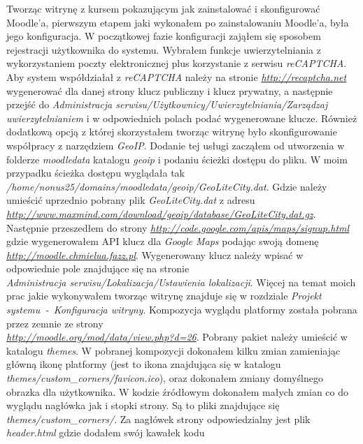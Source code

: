 Tworząc witrynę z kursem pokazującym jak zainstalować i skonfigurować Moodle'a, pierwszym etapem jaki wykonałem po zainstalowaniu Moodle'a, była jego konfiguracja. W początkowej fazie konfiguracji zająłem się sposobem rejestracji użytkownika do systemu. Wybrałem funkcje uwierzytelniania z wykorzystaniem poczty elektronicznej plus korzystanie z serwisu \textit{reCAPTCHA}. Aby system współdziałał z \textit{reCAPTCHA} należy na stronie \href{http://recaptcha.net}{\textit{http://recaptcha.net}} wygenerować dla danej strony klucz publiczny i klucz prywatny, a następnie przejść do \textit{Administracja serwisu/Użytkownicy/Uwierzytelniania/Zarządzaj uwierzytelnianiem} i w odpowiednich polach podać wygenerowane klucze. Również dodatkową opcją z której skorzystałem tworząc witrynę było skonfigurowanie współpracy z narzędziem \textit{GeoIP}. Dodanie tej usługi zacząłem od utworzenia w folderze \textit{moodledata} katalogu \textit{geoip} i podaniu ścieżki dostępu do pliku. W moim przypadku ścieżka dostępu wyglądała tak \textit{/home/nonus25/domains/moodledata/geoip/GeoLiteCity.dat}. Gdzie należy umieścić uprzednio pobrany plik \textit{GeoLiteCity.dat} z adresu\\ \href{http://www.maxmind.com/download/geoip/database/GeoLiteCity.dat.gz}{\textit{http://www.maxmind.com/download/geoip/database/GeoLiteCity.dat.gz}}. Następnie przeszedłem do strony \href{http://code.google.com/apis/maps/signup.html}{\textit{http://code.google.com/apis/maps/signup.html}} gdzie wygenerowałem API klucz dla \textit{Google Maps} podając swoją domenę \href{http://moodle.chmielua.fazz.pl}{\textit{http://moodle.chmielua.fazz.pl}}. Wygenerowany klucz należy wpisać w odpowiednie pole znajdujące się na stronie\\ \textit{Administracja serwisu/Lokalizacja/Ustawienia lokalizacji}. Więcej na temat moich prac jakie wykonywałem tworząc witrynę znajduje się w rozdziale \textit{Projekt systemu~-~Konfiguracja witryny}. Kompozycja wyglądu platformy została pobrana przez zemnie ze strony \\ \href{http://moodle.org/mod/data/view.php?d=26}{\textit{http://moodle.org/mod/data/view.php?d=26}}. Pobrany pakiet należy umieścić w katalogu \textit{themes}. W pobranej kompozycji dokonałem kilku zmian zamieniając główną ikonę platformy (jest to ikona znajdująca się w katalogu \textit{themes/custom\_corners/favicon.ico}), oraz dokonałem zmiany domyślnego obrazka dla użytkownika. W kodzie źródłowym dokonałem małych zmian co do wyglądu nagłówka jak i stopki strony. Są to pliki znajdujące się \textit{themes/custom\_corners/}. Za nagłówek strony odpowiedzialny jest plik \textit{header.html} gdzie dodałem swój kawałek kodu 
